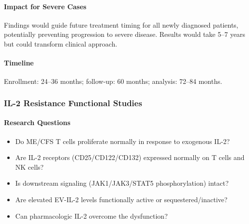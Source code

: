 \paragraph{Impact for Severe Cases}
Findings would guide future treatment timing for all newly diagnosed patients, potentially preventing progression to severe disease. Results would take 5--7 years but could transform clinical approach.

\paragraph{Timeline}
Enrollment: 24--36 months; follow-up: 60 months; analysis: 72--84 months.

\subsubsection{IL-2 Resistance Functional Studies}

\paragraph{Research Questions}
\begin{itemize}
    \item Do ME/CFS T cells proliferate normally in response to exogenous IL-2?
    \item Are IL-2 receptors (CD25/CD122/CD132) expressed normally on T cells and NK cells?
    \item Is downstream signaling (JAK1/JAK3/STAT5 phosphorylation) intact?
    \item Are elevated EV-IL-2 levels functionally active or sequestered/inactive?
    \item Can pharmacologic IL-2 overcome the dysfunction?
\end{itemize}

